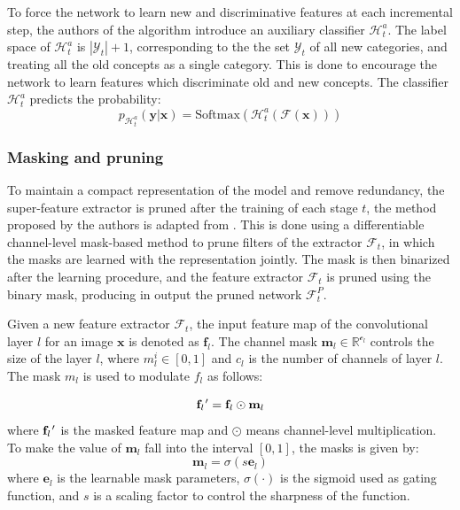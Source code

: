 To force the network to learn new and discriminative features at each incremental step, the authors of the algorithm introduce an auxiliary classifier $\mathcal{H}_t^a$. The label space of $\mathcal{H}_t^a$ is $|\mathcal{Y}_t| + 1$, corresponding to the the set $\mathcal{Y}_t$ of all new categories, and treating all the old concepts as a single category. This is done to encourage the network to learn features which discriminate old and new concepts. The classifier $\mathcal{H}_t^a$ predicts the probability:
\begin{equation} \label{eq:loss-aux}
    p_{\mathcal{H}_t^a}(\textbf{y}|\textbf{x}) = \text{Softmax}(\mathcal{H}_t^a(\mathcal{F}(\textbf{x})))
\end{equation}

\subsubsection{Masking and pruning}
To maintain a compact representation of the model and remove redundancy, the super-feature extractor is pruned after the training of each stage $t$, the method proposed by the authors is adapted from \cite{serra2018overcoming}. This is done using a differentiable channel-level mask-based method to prune filters of the extractor $\mathcal{F}_t$, in which
the masks are learned with the representation jointly. The mask is then binarized after the learning procedure, and the feature extractor $\mathcal{F}_t$ is pruned using the binary mask, producing in output the pruned network $\mathcal{F}_t^{P}$.

Given a new feature extractor $\mathcal{F}_t$, the input feature map of the convolutional layer $l$ for an image $\textbf{x}$ is denoted as $\textbf{f}_l$. The channel mask $\textbf{m}_l \in \mathbb{R}^{\mathcal{c}_l}$ controls the size of the layer $l$, where $m_l^i \in [0, 1]$ and $c_l$ is the number of channels of layer $l$. The mask $m_l$ is used to modulate $f_l$ as follows:

\begin{equation}
    \textbf{f}_l \kern 0.05em ' = \textbf{f}_l \odot \textbf{m}_l
\end{equation}
where $\textbf{f}_l \kern 0.05em '$ is the masked feature map and $\odot$ means channel-level multiplication. To make the value of $\textbf{m}_l$ fall into the interval $[0,1]$, the masks is given by:
\begin{equation}
    \textbf{m}_l = \sigma(s \textbf{e}_l)
\end{equation}
where $\textbf{e}_l$ is the learnable mask parameters, $\sigma(\cdot)$ is the sigmoid used as gating function, and $s$ is a scaling factor to control the sharpness of the function.


